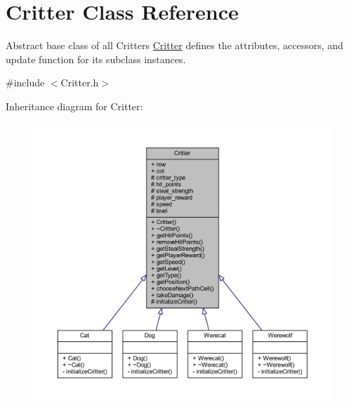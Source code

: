 \hypertarget{class_critter}{\section{Critter Class Reference}
\label{class_critter}
}


Abstract base class of all Critters \hyperlink{class_critter}{Critter} defines the attributes, accessors, and update function for its subclass instances.  




{\ttfamily \#include $<$Critter.\+h$>$}



Inheritance diagram for Critter\+:
\nopagebreak
\begin{figure}[H]
\begin{center}
\leavevmode
\includegraphics[width=350pt]{class_critter__inherit__graph}
\end{center}
\end{figure}


